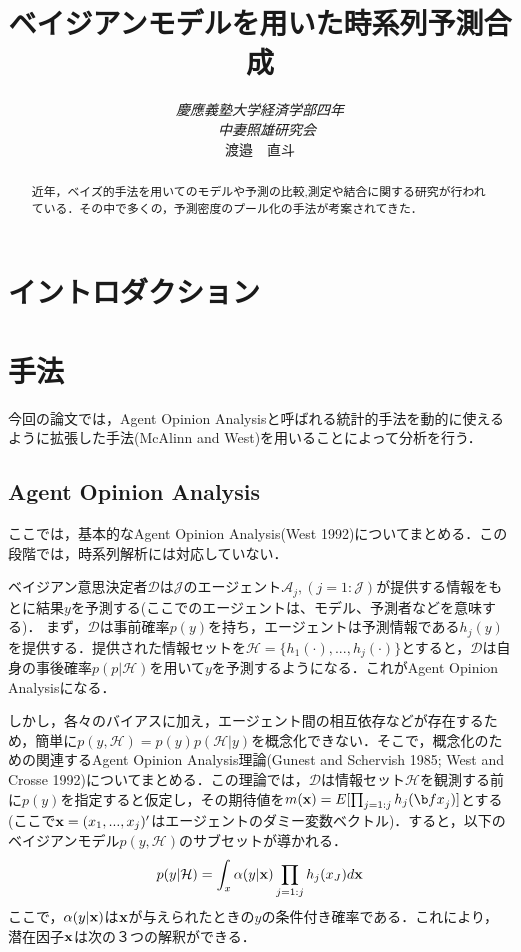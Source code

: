 \documentclass[11pt,a4paper]{article}
\title{ベイジアンモデルを用いた時系列予測合成}
\author{\emph{慶應義塾大学経済学部四年}\\　\emph{中妻照雄研究会} \\渡邉　直斗  }
\date{}
\begin{document}
\maketitle

\begin{abstract}
近年，ベイズ的手法を用いてのモデルや予測の比較,測定や結合に関する研究が行われている．その中で多くの，予測密度のプール化の手法が考案されてきた．
\end{abstract}

\clearpage
\setcounter{tocdepth}{1}
\tableofcontents
\clearpage
\newtheorem{theo}{定理}[section]
\newtheorem{defi}[theo]{定義}
\newtheorem{lemm}[theo]{補題}
\newtheorem{Proof}{証明}

\section{イントロダクション}


\section{手法}
今回の論文では，Agent Opinion Analysisと呼ばれる統計的手法を動的に使えるように拡張した手法(McAlinn and West)を用いることによって分析を行う．
\subsection{Agent Opinion Analysis}
ここでは，基本的なAgent Opinion Analysis(West 1992)についてまとめる．この段階では，時系列解析には対応していない．\par
ベイジアン意思決定者$\mathcal{D}$は$\mathcal{J}$のエージェント$\mathcal{A}_j,(j = 1:\mathcal{J})$が提供する情報をもとに結果$y$を予測する(ここでのエージェントは、モデル、予測者などを意味する)．
まず，$\mathcal{D}$は事前確率$p(y)$を持ち，エージェントは予測情報である$h_j(y)$を提供する．提供された情報セットを$\mathcal{H} = \{h_1(\cdot),...,h_j(\cdot)\}$とすると，$\mathcal{D}$は自身の事後確率$p(p|\mathcal{H})$を用いて$y$を予測するようになる．これがAgent Opinion Analysisになる．\par
しかし，各々のバイアスに加え，エージェント間の相互依存などが存在するため，簡単に$p(y,\mathcal{H})=p(y)p(\mathcal{H}|y)$を概念化できない．そこで，概念化のための関連するAgent Opinion Analysis理論(Gunest and Schervish 1985; West and Crosse 1992)についてまとめる．この理論では，$\mathcal{D}$は情報セット$\mathcal{H}$を観測する前に$p(y)$を指定すると仮定し，その期待値を$m({\bf x}) = E[\prod_{j=1:j}h_j({\b fx}_j)]$とする(ここで$\bold{x} = (x_1,...,x_j)'$はエージェントのダミー変数ベクトル)．すると，以下のベイジアンモデル$p(y,\mathcal{H})$のサブセットが導かれる．
\[
p(y|\mathcal{H}) = \int_x \alpha(y|{\bf x}) \prod_{j=1:j} h_j(x_J)d\bf x
\]
ここで，$\alpha (y|\bf x)$は$\bf x$が与えられたときの$y$の条件付き確率である．これにより，潜在因子$\bf x$は次の３つの解釈ができる．
\end{document}
